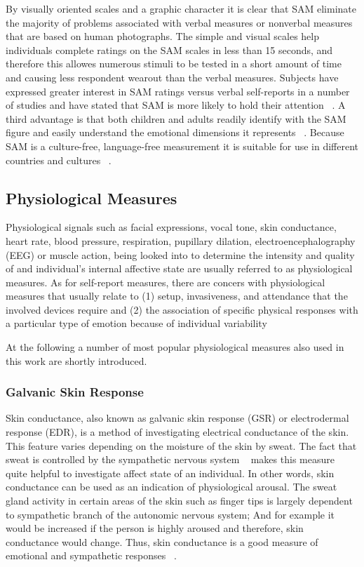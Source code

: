By visually oriented scales and a graphic character it is clear that SAM eliminate the majority of problems associated with verbal measures or nonverbal measures that are based on human photographs. The simple and visual scales help individuals complete ratings on the SAM scales in less than 15 seconds, and therefore this allowes numerous stimuli to be tested in a short amount of time and causing less respondent wearout than the verbal measures. Subjects have expressed greater interest in SAM ratings versus verbal self-reports in a number of studies and have stated that SAM is more likely to hold their attention ~\cite{lang1985cognitive}. A third advantage is that both children and adults readily identify with the SAM figure and easily understand the emotional dimensions it represents ~\cite{lang1985cognitive}. Because SAM is a culture-free, language-free measurement it is suitable for use in different countries and cultures ~\cite{bradley1993affective}.


\subsection{Physiological Measures}

Physiological signals such as facial expressions, vocal tone, skin conductance, heart rate, blood pressure, respiration, pupillary dilation, electroencephalography (EEG) or muscle action, being looked into to determine the intensity and quality of and individual's internal affective state are usually referred to as physiological measures. As for self-report measures, there are concers with physiological measures that usually relate to (1) setup, invasiveness, and attendance that the involved devices require and (2) the association of specific physical responses with a particular type of emotion because of individual variability ~\cite{depaula2005cognitive}

At the following a number of most popular physiological measures also used in this work are shortly introduced.

\subsubsection{Galvanic Skin Response}
Skin conductance, also known as galvanic skin response (GSR) or electrodermal response (EDR), is a method of investigating electrical conductance of the skin. This feature varies depending on the moisture of the skin by sweat. The fact that sweat is controlled by the sympathetic nervous system ~\cite{seiger2002essentials} makes this measure quite helpful to investigate affect state of an individual. In other words, skin conductance can be used as an indication of physiological arousal. The sweat gland activity in certain areas of the skin such as finger tips is largely dependent to sympathetic branch of the autonomic nervous system; And for example it would be increased if the person is highly aroused and therefore, skin conductance would change. Thus, skin conductance is a good measure of emotional and sympathetic responses ~\cite{carlson2013physiology}.

